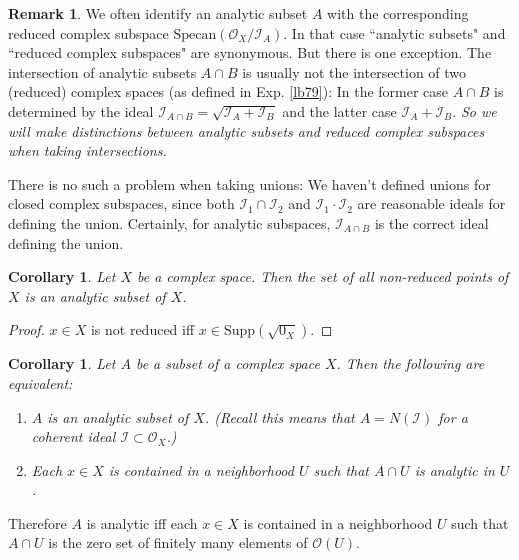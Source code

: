 \documentclass[12pt,b5paper,notitlepage]{report}
\theoremstyle{definition}
\newtheorem{rem}[df]{Remark}
\theoremstyle{plain}
\newtheorem{co}[df]{Corollary}
\newcommand{\mc}{\mathcal}
\newcommand{\scr}{\mathscr}
\newcommand{\Supp}{\mathrm{Supp}}
\newcommand{\Specan}{\mathrm{Specan}}
\numberwithin{equation}{section}
\begin{document}
\begin{rem}\label{lb127}
We often identify an analytic subset $A$ with the corresponding reduced complex subspace $\Specan(\scr O_X/\scr I_A)$.  In that case ``analytic subsets" and ``reduced complex subspaces" are synonymous. But there is one exception. The intersection of analytic subsets $A\cap B$ is usually not the intersection of two (reduced) complex spaces (as defined in Exp. \ref{lb79}): In the former case $A\cap B$ is determined by the ideal $\scr I_{A\cap B}=\sqrt{\scr I_A+\scr I_B}$ and the latter case $\scr I_A+\scr I_B$. {\color{red}\textit{So we will make distinctions between analytic subsets and reduced complex subspaces when taking intersections.}} 

There is no such a problem when taking unions: We haven't defined unions for closed complex subspaces, since both $\mc I_1\cap \mc I_2$ and $\mc I_1\cdot\mc I_2$ are reasonable ideals for defining the union. Certainly, for analytic subspaces, $\scr I_{A\cap B}$ is the correct ideal defining the union.   \hfill\qedsymbol
\end{rem}



\begin{co}\label{lb135}
Let $X$ be a complex space. Then the set of all non-reduced points of $X$ is an analytic subset of $X$.
\end{co}


\begin{proof}
$x\in X$ is not reduced iff $x\in\Supp(\sqrt{0_X})$.
\end{proof}



\begin{co}\label{lb136}
Let $A$ be a subset of a complex space $X$. Then the following are equivalent:
\begin{enumerate}[label=(\arabic*)]
\item $A$ is an analytic subset of $X$. (Recall this means that $A=N(\mc I)$ for a coherent ideal $\mc I\subset\scr O_X$.)
\item Each $x\in X$ is contained in a neighborhood $U$ such that $A\cap U$ is analytic in $U$.
\end{enumerate}
\end{co}


Therefore $A$ is analytic iff each $x\in X$ is contained in a neighborhood $U$ such that $A\cap U$ is the zero set of finitely many elements of $\scr O(U)$.
\end{document}
